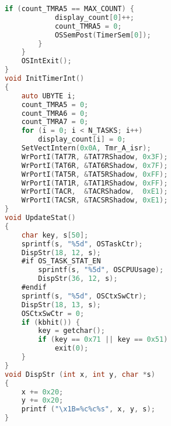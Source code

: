 \begin{lstlisting}[language=C]
        if (count_TMRA5 == MAX_COUNT) {
            display_count[0]++;
            count_TMRA5 = 0;
            OSSemPost(TimerSem[0]);
        }
    }
    OSIntExit();
}
void InitTimerInt()
{
    auto UBYTE i;
    count_TMRA5 = 0;
    count_TMRA6 = 0;
    count_TMRA7 = 0;
    for (i = 0; i < N_TASKS; i++)
        display_count[i] = 0;
    SetVectIntern(0x0A, Tmr_A_isr);
    WrPortI(TAT7R, &TAT7RShadow, 0x3F);
    WrPortI(TAT6R, &TAT6RShadow, 0x7F);
    WrPortI(TAT5R, &TAT5RShadow, 0xFF);
    WrPortI(TAT1R, &TAT1RShadow, 0xFF);
    WrPortI(TACR,  &TACRShadow,  0xE1);
    WrPortI(TACSR, &TACSRShadow, 0xE1);
}
void UpdateStat()
{
    char key, s[50];
    sprintf(s, "%5d", OSTaskCtr);
    DispStr(18, 12, s);
    #if OS_TASK_STAT_EN
        sprintf(s, "%5d", OSCPUUsage);
        DispStr(36, 12, s);
    #endif
    sprintf(s, "%5d", OSCtxSwCtr);
    DispStr(18, 13, s);
    OSCtxSwCtr = 0;
    if (kbhit()) {
        key = getchar();
        if (key == 0x71 || key == 0x51)
            exit(0);
    }
}
void DispStr (int x, int y, char *s)
{
    x += 0x20;
    y += 0x20;
    printf ("\x1B=%c%c%s", x, y, s);
}
\end{lstlisting}
\\ 
\\ 
\\ 
\\ 
\\ 